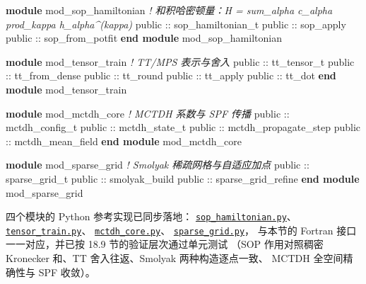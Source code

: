 \documentclass[
]{ctexbook}
\newenvironment{Shaded}{}{}
\newcommand{\CommentTok}[1]{\textcolor[rgb]{0.38,0.63,0.69}{\textit{#1}}}
\newcommand{\DataTypeTok}[1]{\textcolor[rgb]{0.56,0.13,0.00}{#1}}
\newcommand{\KeywordTok}[1]{\textcolor[rgb]{0.00,0.44,0.13}{\textbf{#1}}}
\newcommand{\NormalTok}[1]{#1}
\begin{document}
\begin{Shaded}
\begin{Highlighting}[]
\KeywordTok{module}\NormalTok{ mod\_sop\_hamiltonian}
    \CommentTok{! 和积哈密顿量：H = sum\_alpha c\_alpha prod\_kappa h\_alpha\^{}(kappa)}
    \DataTypeTok{public} \DataTypeTok{::}\NormalTok{ sop\_hamiltonian\_t}
    \DataTypeTok{public} \DataTypeTok{::}\NormalTok{ sop\_apply}
    \DataTypeTok{public} \DataTypeTok{::}\NormalTok{ sop\_from\_potfit}
\KeywordTok{end module}\NormalTok{ mod\_sop\_hamiltonian}

\KeywordTok{module}\NormalTok{ mod\_tensor\_train}
    \CommentTok{! TT/MPS 表示与舍入}
    \DataTypeTok{public} \DataTypeTok{::}\NormalTok{ tt\_tensor\_t}
    \DataTypeTok{public} \DataTypeTok{::}\NormalTok{ tt\_from\_dense}
    \DataTypeTok{public} \DataTypeTok{::}\NormalTok{ tt\_round}
    \DataTypeTok{public} \DataTypeTok{::}\NormalTok{ tt\_apply}
    \DataTypeTok{public} \DataTypeTok{::}\NormalTok{ tt\_dot}
\KeywordTok{end module}\NormalTok{ mod\_tensor\_train}

\KeywordTok{module}\NormalTok{ mod\_mctdh\_core}
    \CommentTok{! MCTDH 系数与 SPF 传播}
    \DataTypeTok{public} \DataTypeTok{::}\NormalTok{ mctdh\_config\_t}
    \DataTypeTok{public} \DataTypeTok{::}\NormalTok{ mctdh\_state\_t}
    \DataTypeTok{public} \DataTypeTok{::}\NormalTok{ mctdh\_propagate\_step}
    \DataTypeTok{public} \DataTypeTok{::}\NormalTok{ mctdh\_mean\_field}
\KeywordTok{end module}\NormalTok{ mod\_mctdh\_core}

\KeywordTok{module}\NormalTok{ mod\_sparse\_grid}
    \CommentTok{! Smolyak 稀疏网格与自适应加点}
    \DataTypeTok{public} \DataTypeTok{::}\NormalTok{ sparse\_grid\_t}
    \DataTypeTok{public} \DataTypeTok{::}\NormalTok{ smolyak\_build}
    \DataTypeTok{public} \DataTypeTok{::}\NormalTok{ sparse\_grid\_refine}
\KeywordTok{end module}\NormalTok{ mod\_sparse\_grid}
\end{Highlighting}
\end{Shaded}

四个模块的 Python 参考实现已同步落地：
\href{https://github.com/l1Ha/QuantumGeneralModule/blob/main/python/pygenmod/sop_hamiltonian.py}{\texttt{sop\_hamiltonian.py}}、
\href{https://github.com/l1Ha/QuantumGeneralModule/blob/main/python/pygenmod/tensor_train.py}{\texttt{tensor\_train.py}}、
\href{https://github.com/l1Ha/QuantumGeneralModule/blob/main/python/pygenmod/mctdh_core.py}{\texttt{mctdh\_core.py}}、
\href{https://github.com/l1Ha/QuantumGeneralModule/blob/main/python/pygenmod/sparse_grid.py}{\texttt{sparse\_grid.py}}，
与本节的 Fortran 接口一一对应，并已按 18.9 节的验证层次通过单元测试
（SOP 作用对照稠密 Kronecker 和、TT 舍入往返、Smolyak 两种构造逐点一致、
MCTDH 全空间精确性与 SPF 收敛）。
\end{document}
